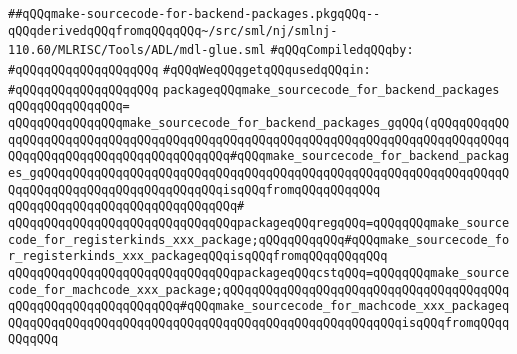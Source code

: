 \label{src/lib/compiler/back/low/tools/arch/make-sourcecode-for-backend-packages.pkg}
\verb|##qQQqmake-sourcecode-for-backend-packages.pkgqQQq--qQQqderivedqQQqfromqQQqqQQq~/src/sml/nj/smlnj-110.60/MLRISC/Tools/ADL/mdl-glue.sml|\newline
\newline
\verb|#qQQqCompiledqQQqby:|\newline
\verb|#qQQqqQQqqQQqqQQqqQQq|\newline
\newline
\verb|#qQQqWeqQQqgetqQQqusedqQQqin:|\newline
\verb|#qQQqqQQqqQQqqQQqqQQq|\newline
\newline
\verb|packageqQQqmake_sourcecode_for_backend_packages|\newline
\verb|qQQqqQQqqQQqqQQq=|\newline
\verb|qQQqqQQqqQQqqQQqmake_sourcecode_for_backend_packages_gqQQq(qQQqqQQqqQQqqQQqqQQqqQQqqQQqqQQqqQQqqQQqqQQqqQQqqQQqqQQqqQQqqQQqqQQqqQQqqQQqqQQqqQQqqQQqqQQqqQQqqQQqqQQqqQQqqQQq#qQQqmake_sourcecode_for_backend_packages_gqQQqqQQqqQQqqQQqqQQqqQQqqQQqqQQqqQQqqQQqqQQqqQQqqQQqqQQqqQQqqQQqqQQqqQQqqQQqqQQqqQQqqQQqqQQqqQQqisqQQqfromqQQqqQQqqQQq|\newline
\verb|qQQqqQQqqQQqqQQqqQQqqQQqqQQqqQQq#|\newline
\verb|qQQqqQQqqQQqqQQqqQQqqQQqqQQqqQQqpackageqQQqregqQQq=qQQqqQQqmake_sourcecode_for_registerkinds_xxx_package;qQQqqQQqqQQq#qQQqmake_sourcecode_for_registerkinds_xxx_packageqQQqisqQQqfromqQQqqQQqqQQq|\newline
\verb|qQQqqQQqqQQqqQQqqQQqqQQqqQQqqQQqpackageqQQqcstqQQq=qQQqqQQqmake_sourcecode_for_machcode_xxx_package;qQQqqQQqqQQqqQQqqQQqqQQqqQQqqQQqqQQqqQQqqQQqqQQqqQQqqQQqqQQqqQQq#qQQqmake_sourcecode_for_machcode_xxx_packageqQQqqQQqqQQqqQQqqQQqqQQqqQQqqQQqqQQqqQQqqQQqqQQqqQQqqQQqisqQQqfromqQQqqQQqqQQq|\newline
